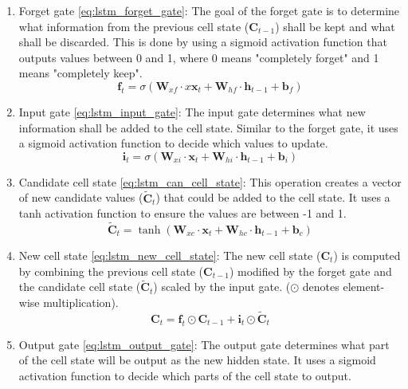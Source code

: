 \begin{enumerate}
    \item Forget gate \ref{eq:lstm_forget_gate}: The goal of the forget gate is to determine what information from the previous cell state ($\mathbf{C}_{t-1}$) shall be kept and what shall be discarded. This is done by using a sigmoid activation function that outputs values between 0 and 1, where 0 means "completely forget" and 1 means "completely keep".
    \begin{equation}
        \mathbf{f}_t = \sigma(\mathbf{W}_{xf} \cdot x\mathbf{x}_t + \mathbf{W}_{hf} \cdot \mathbf{h}_{t-1} + \mathbf{b}_f)
        \label{eq:lstm_forget_gate}
    \end{equation}
    \item Input gate \ref{eq:lstm_input_gate}: The input gate determines what new information shall be added to the cell state. Similar to the forget gate, it uses a sigmoid activation function to decide which values to update.
    \begin{equation}
        \mathbf{i}_t = \sigma(\mathbf{W}_{xi} \cdot \mathbf{x}_t + \mathbf{W}_{hi} \cdot \mathbf{h}_{t-1} + \mathbf{b}_i)
        \label{eq:lstm_input_gate}
    \end{equation}
    \item Candidate cell state \ref{eq:lstm_can_cell_state}: This operation creates a vector of new candidate values ($\tilde{\mathbf{C}}_t$) that could be added to the cell state. It uses a tanh activation function to ensure the values are between -1 and 1.
    \begin{equation}
        \tilde{\mathbf{C}}_t = \tanh(\mathbf{W}_{xc} \cdot \mathbf{x}_t + \mathbf{W}_{hc} \cdot \mathbf{h}_{t-1} + \mathbf{b}_c)
        \label{eq:lstm_can_cell_state}
    \end{equation}
    \item New cell state \ref{eq:lstm_new_cell_state}: The new cell state ($\mathbf{C}_t$) is computed by combining the previous cell state ($\mathbf{C}_{t-1}$) modified by the forget gate and the candidate cell state ($\tilde{\mathbf{C}}_t$) scaled by the input gate. ($\odot$ denotes element-wise multiplication).
    \begin{equation}
        \mathbf{C}_t = \mathbf{f}_t \odot \mathbf{C}_{t-1} + \mathbf{i}_t \odot \tilde{\mathbf{C}}_t
        \label{eq:lstm_new_cell_state}
    \end{equation}
    \item Output gate \ref{eq:lstm_output_gate}: The output gate determines what part of the cell state will be output as the new hidden state. It uses a sigmoid activation function to decide which parts of the cell state to output.

\end{enumerate}
